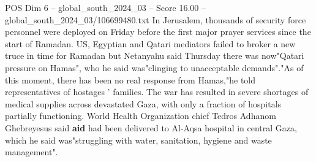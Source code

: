 \begin{textsample}{POS Dim 6 – global\_south\_2024\_03 – Score 16.00 – global\_south\_2024\_03/106699480.txt}
In Jerusalem, thousands of security force personnel were deployed on Friday before the first major prayer services since the start of Ramadan.
US, Egyptian and Qatari mediators failed to broker a new truce in time for Ramadan but Netanyahu said Thursday there was now"Qatari pressure on Hamas", who he said was"clinging to unacceptable demands"."As of this moment, there has been no real response from Hamas,"he told representatives of hostages ' families.
The war has resulted in severe shortages of medical supplies across devastated Gaza, with only a fraction of hospitals partially functioning.
World Health Organization chief Tedros Adhanom Ghebreyesus said \textbf{aid} had been delivered to Al-Aqsa hospital in central Gaza, which he said was"struggling with water, sanitation, hygiene and waste management".

\end{textsample}
